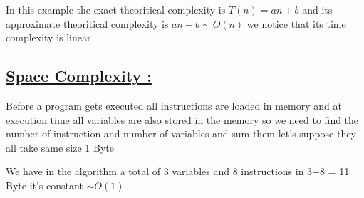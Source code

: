 \vspace{0.75cm}
In this example the exact theoritical complexity is \(T(n) = an+b\) and its approximate theoritical complexity is 
\(an+b \sim O(n)\) we notice that its time complexity is linear 

\begin{center}
\end{center}
\subsection*{\underline{Space Complexity :}}
Before a program gets executed all instructions are loaded in memory and at execution time all variables are also stored
in the memory so we need to find the number of instruction and number of variables and sum them let's suppose they all take same size 1 Byte

\vspace{0.15cm}
We have in the algorithm a total of 3 variables and 8 instructions in 3+8 = 11 Byte it's constant \(\sim O(1)\)
